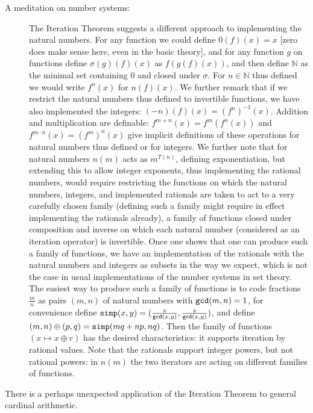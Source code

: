 \documentclass[12pt]{article}
\begin{document}
\begin{description}

\item[A meditation on number systems:]  The Iteration Theorem suggests a different approach to implementing the natural numbers.  For any function we could define $0(f)(x)=x$ [zero does make sense here, even in the basic theory], and for any function
$g$ on functions define $\sigma(g)(f)(x)$ as $f(g(f)(x))$, and then define $\mathbb N$ as the minimal set containing 0 and closed under $\sigma$.  For $n \in \mathbb N$ thus defined we would write $f^n(x)$ for $n(f)(x)$.  We further remark that if we restrict the natural numbers thus defined to invertible functions,
we have also implemented the integers:  $(-n)(f)(x) = (f^n)^{-1}(x)$.  Addition and multiplication are definable:  $f^{m+n}(x) = f^m(f^n(x))$ and
$f^{m \cdot n}(x) = (f^m)^n(x)$ give implicit definitions of these operations for natural numbers thus defined or for integers.  We further note that for natural numbers $n(m)$ acts as $m^{T(n)}$, defining exponentiation, but extending this to allow integer exponents, thus implementing the rational numbers, would require restricting the functions on which the natural numbers, integers, and implemented rationals are taken to act to a very carefully chosen family (defining such a family might require in effect implementing the rationals already), a family of functions closed under composition and inverse on which each natural number (considered as an iteration operator) is invertible.  Once one shows that one can produce such a family of functions, we have an implementation of the rationals with the natural numbers and integers as subsets in the way we expect, which is not the case in usual implementations of the number systems in set theory.  The easiest way to produce such a family of functions is to code fractions $\frac mn$ as pairs $(m,n)$ of natural numbers
with ${\tt gcd}(m,n)=1$, for convenience define ${\tt simp}(x,y) = (\frac x{{\tt gcd}(x,y)},\frac x{{\tt gcd}(x,y)})$, and define $(m,n) \oplus (p,q) = {\tt simp}(mq+np,nq)$.  Then the family of functions
$(x \mapsto x \oplus r)$ has the desired characteristics:  it supports iteration by rational values.  Note that the rationals support integer powers, but not rational powers:  in $n(m)$ the two iterators are acting on different families of functions.

\end{description}

There is a perhaps unexpected application of the Iteration Theorem to general cardinal arithmetic.
\end{document}
